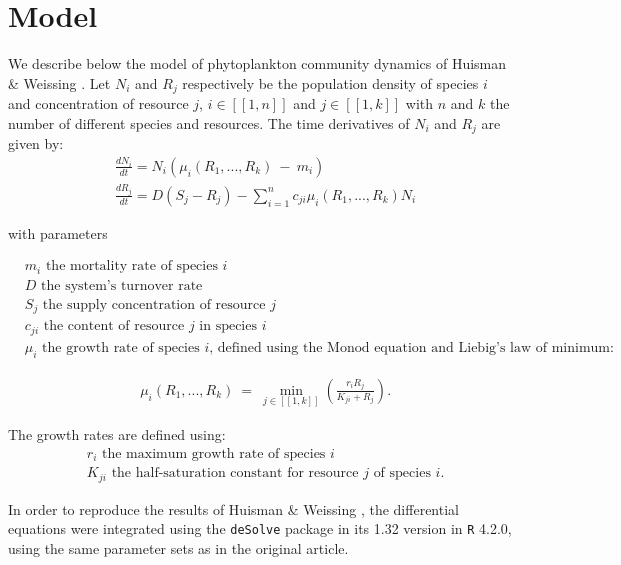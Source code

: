 \section{Model}

We describe below the model of phytoplankton community dynamics of Huisman \& Weissing \cite{1999:Huisman}. Let $N_i$ and $R_j$ respectively be the population density of species $i$ and concentration of resource $j$, $i\in[\![1,n]\!]$ and $j\in[\![1,k]\!]$ with $n$ and $k$ the number of different species and resources. The time derivatives of $N_i$ and $R_j$ are given by: \\

\begin{align}
	& \frac{dN_i}{dt}= N_i(\mu_i(R_1,...,R_k)~-~m_i)\\
	& \frac{dR_j}{dt}= D(S_j-R_j) - \sum_{i=1}^n c_{ji} 
\mu_i(R_1,...,R_k)N_i
\end{align}

with parameters

\begin{align*}
& m_i \text{ the mortality rate of species $i$}\\
& D \text{ the system's turnover rate}\\
& S_j \text{ the supply concentration of resource $j$}\\
& c_{ji} \text{ the content of resource $j$ in species $i$}\\
& \mu_i \text{ the growth rate of species $i$, defined using the Monod equation and Liebig's law of minimum: }
\end{align*}

\begin{align}
&\mu_i(R_1,...,R_k)~=~\min_{j\in[\![1,k]\!]} \left( \frac{r_iR_j}{K_{ji}+R_j} \right). 
\end{align}

The growth rates are defined using: 
\begin{align*}
&r_i \text{ the maximum growth rate of species $i$}\\
&K_{	ji} \text{ the half-saturation constant for resource $j$ of species $i$.}
\end{align*}

In order to reproduce the results of Huisman \& Weissing \cite{1999:Huisman}, the differential equations were integrated using the \texttt{deSolve} package in its 1.32 version in \texttt{R} 4.2.0, using the same parameter sets as in the original article.\\

